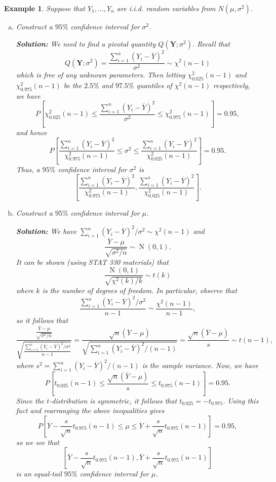 \documentclass[10pt]{article}
\DeclareMathOperator{\Nor}{N}
\theoremstyle{newstyle}
\newtheorem{exmp}[thm]{Example}
\begin{document}
\begin{exmp}
Suppose that $Y_1, \dots, Y_n$ are i.i.d. random variables from $N(\mu, \sigma^2)$. 
\begin{enumerate}[(a)]
    \item Construct a $95\%$ confidence interval for $\sigma^2$. 
    
    {\color{blue} 
    {\bf Solution:}  
    We need to find a pivotal quantity $Q(\mathbf Y; \sigma^2)$. Recall that 
    \[ Q(\mathbf Y; \sigma^2) = \frac{\sum_{i=1}^n (Y_i - \overline Y)^2}{\sigma^2} 
    \sim \chi^2(n-1) \]
    which is free of any unknown parameters. Then letting $\chi^2_{0.025}(n-1)$ and 
    $\chi^2_{0.975}(n-1)$ be the $2.5\%$ and $97.5\%$ quantiles of $\chi^2(n-1)$ 
    respectively, we have
    \[ P \left[ \chi^2_{0.025}(n-1) \leq \frac{\sum_{i=1}^n (Y_i - \overline Y)^2}{\sigma^2} 
    \leq \chi^2_{0.975}(n-1) \right] = 0.95, \]
    and hence 
    \[ P \left[ \frac{\sum_{i=1}^n (Y_i - \overline Y)^2}{\chi^2_{0.975}(n-1)} 
    \leq \sigma^2 \leq \frac{\sum_{i=1}^n (Y_i - \overline Y)^2}{\chi^2_{0.025}(n-1)} \right]
    = 0.95. \]
    Thus, a $95\%$ confidence interval for $\sigma^2$ is 
    \[ \left[ \frac{\sum_{i=1}^n (Y_i - \overline Y)^2}{\chi^2_{0.975}(n-1)}, 
    \frac{\sum_{i=1}^n (Y_i - \overline Y)^2}{\chi^2_{0.025}(n-1)} \right]. \]}
    \vspace{-2ex}
    \item Construct a $95\%$ confidence interval for $\mu$. 
    
    {\color{blue} 
    {\bf Solution:}  
    We have $\sum_{i=1}^n (Y_i - \overline Y)^2 / \sigma^2 \sim \chi^2(n-1)$ 
    and 
    \[ \frac{\overline Y - \mu}{\sqrt{\sigma^2/n}} \sim \Nor(0, 1). \]
    It can be shown (using STAT 330 materials) that 
    \[ \frac{\Nor(0, 1)}{\sqrt{\chi^2(k)/k}} \sim t(k) \]
    where $k$ is the number of degrees of freedom. In particular, observe that 
    \[ \frac{\sum_{i=1}^n (Y_i - \overline Y)^2 / \sigma^2}{n-1} \sim 
    \frac{\chi^2(n-1)}{n-1}, \]
    so it follows that 
    \[ \frac{ \frac{\overline Y - \mu}{\sqrt{\sigma^2/n}} }{\sqrt{ \frac{\sum_{i=1}^n 
    (Y_i - \overline Y)^2 / \sigma^2}{n-1} }} = 
    \frac{\sqrt n(\overline Y - \mu)}{\sqrt{\sum_{i=1}^n (Y_i - \overline Y)^2 / (n-1)}} 
    = \frac{\sqrt n (\overline Y - \mu)}s \sim t(n-1), \]
    where $s^2 = \sum_{i=1}^n (Y_i - \overline Y)^2/(n-1)$ is the sample variance. 
    Now, we have 
    \[ P \left[ t_{0.025}(n-1) \leq \frac{\sqrt n (\overline Y - \mu)}s \leq 
    t_{0.975}(n-1) \right] = 0.95. \]
    Since the $t$-distribution is symmetric, it follows that 
    $t_{0.025} = -t_{0.975}$. Using this fact and 
    rearranging the above inequalities gives 
    \[ P \left[ \overline Y - \frac{s}{\sqrt n} t_{0.975}(n-1) \leq \mu 
    \leq \overline Y + \frac{s}{\sqrt n} t_{0.975}(n-1) \right] = 0.95, \]
    so we see that 
    \[ \left[ \overline Y - \frac{s}{\sqrt n} t_{0.975}(n-1), 
    \overline Y + \frac{s}{\sqrt n} t_{0.975}(n-1) \right] \]
    is an equal-tail $95\%$ confidence interval for $\mu$.}
    
\end{enumerate}
\end{exmp}
\end{document}
